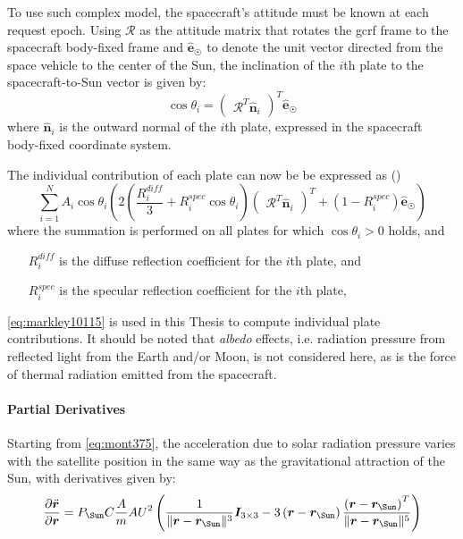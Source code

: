 To use such complex model, the spacecraft's attitude must be known at each request 
epoch. Using $\mathcal{R}$ as the attitude matrix that rotates the \gls{gcrf} frame to the 
spacecraft body-fixed frame and $\hat{\bm{e}}_{\Sun}$ to denote the unit vector directed 
from the space vehicle to the center of the Sun, the inclination of the $i$th plate 
to the spacecraft-to-Sun vector is given by:
\begin{equation}\label{eq:markley10114}
  \cos \theta _{i} =  \begin{pmatrix}\mathcal{R}^T \hat{\bm{n}}_i \end{pmatrix}^T \hat{\bm{e}}_{\Sun}
\end{equation}
where $\hat{\bm{n}}_i$ is the outward normal of the $i$th plate, expressed in the 
spacecraft body-fixed coordinate system.

The individual contribution of each plate can now be be expressed as (\cite{Markley2019})
\begin{equation}\label{eq:markley10115}
  \sum _{i=1}^{N} A_i \cos \theta _{i} \left( 2 \left( \frac{R^{diff}_{i}}{3} + R^{spec}_{i} \cos \theta _{i} \right) \begin{pmatrix}\mathcal{R}^T \hat{\bm{n}}_i \end{pmatrix}^T  + \left( 1 - R_{i}^{spec} \right) \hat{\bm{e}}_{\Sun} \right)
\end{equation}
where the summation is performed on all plates for which $\cos \theta _{i} > 0$ holds, and
\begin{itemize}
  \item[$R^{diff}_{i}$] is the diffuse reflection coefficient for the $i$th plate, and
  \item[$R^{spec}_{i}$] is the specular reflection coefficient for the $i$th plate,
\end{itemize}

\autoref{eq:markley10115} is used in this Thesis to compute individual plate contributions.
It should be noted that \emph{albedo} effects, i.e. radiation pressure from reflected 
light from the Earth and/or Moon, is not considered here, as is the force of thermal 
radiation emitted from the spacecraft.

\paragraph{Partial Derivatives}\label{par:solar-radiation-pressure-partials}
Starting from \ref{eq:mont375}, the acceleration due to solar radiation pressure 
varies with the satellite position in the same way as the gravitational attraction
of the Sun, with derivatives given by:
\begin{equation}
  \label{eq:mont777}
  \frac{\partial \ddot{\bm{r}}}{\partial \bm{r}} = 
  P_{\Sun} C \frac{A}{m} {AU}^2 \left( 
    \frac{1}{\norm{\bm{r} - \bm{r}_{\Sun}}^3} \bm{I}_{3\times 3}
    -3 \left( \bm{r} - \bm{r}_{\Sun} \right) 
      \frac{\left( \bm{r} - \bm{r}_{\Sun} \right) ^T}{\norm{\bm{r} - \bm{r}_{\Sun}}^5}
      \right)
\end{equation}

